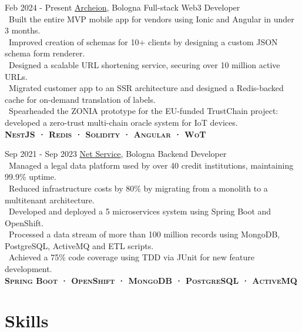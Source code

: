\documentclass{tccv}
\begin{document}
\begin{eventlist}

     \item{Feb 2024 - Present}
     {\href{https://archeion.tech/}{Archeion}, Bologna}
     {Full-stack Web3 Developer} \\
     \textbullet~Built the entire MVP mobile app for vendors using Ionic and Angular in under 3 months. \\
     \textbullet~Improved creation of schemas for 10+ clients by designing a custom JSON schema form renderer. \\
     \textbullet~Designed a scalable URL shortening service, securing over 10 million active URLs. \\
     \textbullet~Migrated customer app to an SSR architecture and designed a Redis-backed cache for on-demand translation of labels. \\
     \textbullet~Spearheaded the ZONIA prototype for the EU-funded TrustChain project: developed a zero-trust multi-chain oracle system for IoT devices. \\
     \textbf{\textsc{NestJS · Redis · Solidity · Angular · WoT}}

     \item{Sep 2021 - Sep 2023}
     {\href{https://www.netservice.eu/}{Net Service}, Bologna}
     {Backend Developer} \\
     \textbullet~Managed a legal data platform used by over 40 credit institutions, maintaining 99.9\% uptime. \\
     \textbullet~Reduced infrastructure costs by 80\% by migrating from a monolith to a multitenant architecture. \\
     \textbullet~Developed and deployed a 5 microservices system using Spring Boot and OpenShift. \\
     \textbullet~Processed a data stream of more than 100 million records using MongoDB, PostgreSQL, ActiveMQ and ETL scripts. \\
     \textbullet~Achieved a 75\% code coverage using TDD via JUnit for new feature development. \\
     \textbf{\textsc{Spring Boot · OpenShift · MongoDB · PostgreSQL · ActiveMQ}}

\end{eventlist}


\section{Skills}
\end{document}
